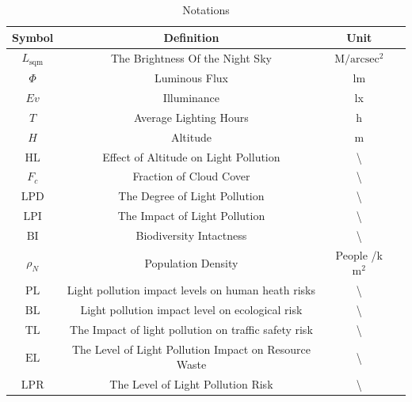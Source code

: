 \documentclass[12pt]{article}
\begin{document}
\begin{table}[H]
	\begin{center}
		\caption{Notations}
		\begin{tabular}{cccc}
			\toprule
			\multicolumn{1}{m{1cm}}{\centering Symbol}
			&\multicolumn{1}{m{10cm}}{\centering Definition}
                &\multicolumn{1}{m{2cm}}{\centering Unit}\\
			\midrule
   $L_{\text{sqm}}$&The Brightness Of the Night Sky &$\text{M}/\text{arcsec}^2$\\
			$\Phi$&Luminous Flux&lm\\
			$Ev$&Illuminance&lx\\
			$T$&Average Lighting Hours&h\\
			$H$&Altitude&m\\
            $\text{HL}$&Effect of Altitude on Light Pollution&\textbackslash\\
                $F_c$&Fraction of Cloud Cover&\textbackslash\\
                $\text{LPD}$&The Degree of Light Pollution&\textbackslash\\
                $\text{LPI}$&The Impact of Light Pollution&\textbackslash\\
                $\text{BI}$&Biodiversity Intactness&\textbackslash\\
                $\rho_N$&Population Density&People /k$\text{m}^2$\\
                $\text{PL}$&Light pollution impact levels on human heath risks&\textbackslash\\
                $\text{BL}$&Light pollution impact level on ecological risk&\textbackslash\\
                $\text{TL}$&The Impact of light pollution on traffic safety risk&\textbackslash\\
                $\text{EL}$&The Level of Light Pollution Impact on Resource Waste&\textbackslash\\
                $\text{LPR}$&The Level of Light Pollution Risk &\textbackslash\\
			\bottomrule
		\end{tabular}\label{Notations}
	\end{center}
\end{table}
\end{document}
